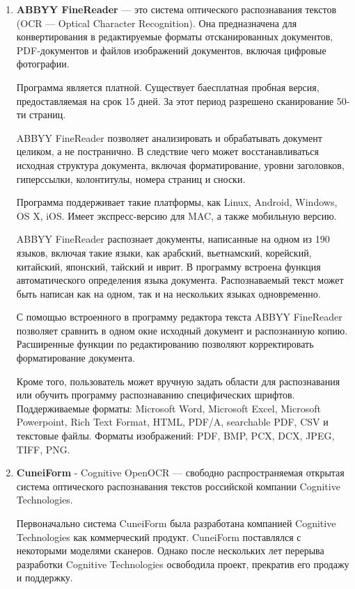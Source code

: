 	\begin{enumerate}
		\item 	\textbf{ABBYY FineReader }— это система оптического распознавания текстов (OCR — Optical Character Recognition). Она предназначена для конвертирования в редактируемые форматы отсканированных документов, PDF-документов и файлов изображений документов, включая цифровые фотографии.
		
		Программа является платной. Существует баесплатная пробная версия, предоставляемая на срок 15 дней. За этот период разрешено сканирование 50-ти страниц.
		
		ABBYY FineReader позволяет анализировать и обрабатывать документ целиком, а не постранично. В следствие чего может восстанавливаться исходная структура документа, включая форматирование, уровни заголовков, гиперссылки, колонтитулы, номера страниц и сноски.
		
		Программа поддерживает такие платформы, как Linux, Android, Windows, OS X, iOS. Имеет экспресс-версию для MAC, а также мобильную версию.
		
		ABBYY FineReader распознает документы, написанные на одном из 190 языков, включая такие языки, как арабский, вьетнамский, корейский, китайский, японский, тайский и иврит. В программу встроена функция автоматического определения языка документа. Распознаваемый текст может быть написан как на одном, так и на нескольких языках одновременно.
		
		С помощью встроенного в программу редактора текста ABBYY FineReader позволяет сравнить в одном окне исходный документ и распознанную копию. Расширенные функции по редактированию позволяют корректировать форматирование документа.
		
		Кроме того, пользователь может вручную задать области для распознавания или обучить программу распознаванию специфических шрифтов.
		Поддерживаемые форматы: Microsoft Word, Microsoft Excel, Microsoft Powerpoint, Rich Text Format, HTML, PDF/A, searchable PDF, CSV и текстовые файлы. Форматы изображений: PDF, BMP, PCX, DCX, JPEG, TIFF, PNG.
		
		\item 	\textbf{CuneiForm} - Cognitive OpenOCR — свободно распространяемая открытая система оптического распознавания текстов российской компании Cognitive Technologies.
		
		Первоначально система CuneiForm была разработана компанией Cognitive Technologies как коммерческий продукт. CuneiForm поставлялся с некоторыми моделями сканеров. Однако после нескольких лет перерыва разработки Cognitive Technologies освободила проект, прекратив его продажу и поддержку.
		

\end{enumerate}

